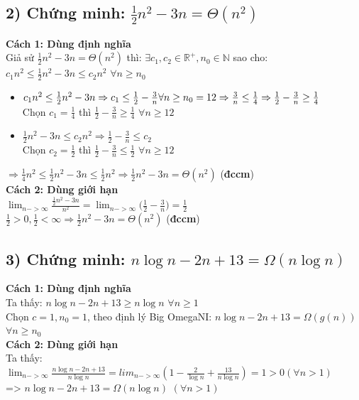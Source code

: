 \documentclass[10pt,a4paper]{article}
\begin{document}
\subsection*{2) Chứng minh: $\frac{1}{2}n^2-3n = \Theta(n^2)$}
\textbf{Cách 1: Dùng định nghĩa}\\
Giả sử $\frac{1}{2}n^2-3n = \Theta(n^2)$ thì: $\exists c_1, c_2 \in \mathbb{R^+},n_0 \in \mathbb{N}$ sao cho: $c_1n^2 \leq \frac{1}{2}n^2-3n \leq c_2n^2$ $\forall n \geq n_0$
\begin{itemize}
    \item $c_1n^2 \leq \frac{1}{2}n^2-3n \Rightarrow c_1 \leq \frac{1}{2} - \frac{3}{n}\\
    \forall n \geq n_0 = 12 \Rightarrow \frac{3}{n} \leq \frac{1}{4} \Rightarrow \frac{1}{2} - \frac{3}{n} \geq \frac{1}{4}$\\
    Chọn $c_1 = \frac{1}{4}$ thì $\frac{1}{2} - \frac{3}{n} \geq \frac{1}{4}$ $\forall n\geq 12$
    \item $\frac{1}{2}n^2-3n \leq c_2n^2 \Rightarrow \frac{1}{2} - \frac{3}{n} \leq c_2$\\
    Chọn $c_2 = \frac{1}{2}$ thì $\frac{1}{2} - \frac{3}{n} \leq \frac{1}{2}$ $\forall n\geq 12$
\end{itemize}
$\Rightarrow \frac{1}{4}n^2 \leq \frac{1}{2}n^2-3n \leq \frac{1}{2}n^2 \Rightarrow \frac{1}{2}n^2-3n = \Theta(n^2)$ (\textbf{đccm})\\
\textbf{Cách 2: Dùng giới hạn}\\
$\lim_{n->\infty}\frac{\frac{1}{2}n^2-3n}{n^2} = \lim_{n->\infty}\big(\frac{1}{2} - \frac{3}{n}\big)=\frac{1}{2}$ \\
$\frac{1}{2} > 0, \frac{1}{2} < \infty \Rightarrow \frac{1}{2}n^2-3n = \Theta(n^2)$ (\textbf{đccm})
\subsection*{3) Chứng minh: $n\log{n}-2n+13 = \Omega(n\log{n})$}
\textbf{Cách 1: Dùng định nghĩa}\\
Ta thấy: $n\log{n} -2n + 13 \geq n\log{n}$ $\forall n \geq 1$ \\
Chọn $c = 1, n_0 = 1$, theo định lý Big OmegaNI: $n\log{n}-2n+13 = \Omega(g(n))$ $\forall n \geq n_0$\\
\textbf{Cách 2: Dùng giới hạn}\\
Ta thấy: $\lim_{n->\infty}{\frac{n\log{n}-2n+13}{n\log{n}}} = lim_{n->\infty}{(1-\frac{2}{\log{n}}+\frac{13}{n\log{n}})} = 1 > 0 (\forall n > 1)$ \\
=> $n\log{n}-2n+13 = \Omega(n\log{n})$ $(\forall n > 1)$
\end{document}
